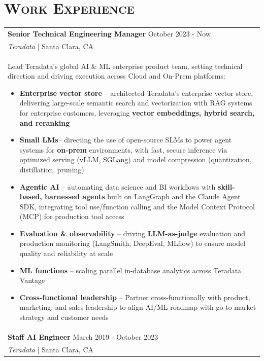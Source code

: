 \documentclass[letterpaper,11pt]{article} %
\begin{document}
\section{\Large\bf\textsc{Work Experience}}
\begin{tabular}{p{18.5cm}}

{\bf Senior Technical Engineering Manager} \hfill October 2023 - Now\\
{\it{Teradata}}  | Santa Clara, CA\\


 Lead Teradata's global AI \& ML enterprise product team, setting technical direction and driving execution across Cloud and On-Prem platforms:
\begin{itemize}
\item \textbf{Enterprise vector store} -- architected Teradata's enterprise vector store, delivering large-scale semantic search and vectorization with RAG systems for enterprise customers, leveraging \textbf{vector embeddings, hybrid search, and reranking}
\item \textbf{Small LMs}-- directing the use of open-source SLMs to power agent systems for \textbf{on-prem} environments, with fast, secure inference via optimized serving (vLLM, SGLang) and model compression (quantization, distillation, pruning) 
\item \textbf{Agentic AI} -- automating data science and BI workflows with \textbf{skill-based, harnessed agents} built on LangGraph and the Claude Agent SDK, integrating tool use/function calling and the Model Context Protocol (MCP) for production tool access
\item \textbf{Evaluation \& observability} – driving \textbf{LLM-as-judge} evaluation and production monitoring (LangSmith, DeepEval, MLflow) to ensure model quality and reliability at scale
\item \textbf{ML functions} -- scaling parallel in-database analytics across Teradata Vantage
\item \textbf{Cross-functional leadership} -- Partner cross-functionally with product, marketing, and sales leadership to align AI/ML roadmap with go-to-market strategy and customer needs 

\end{itemize} \\ 
\vspace{.1mm}

{\bf Staff AI Engineer} \hfill March 2019 - October 2023\\
{\it{Teradata}}  |  Santa Clara, CA\\



\end{tabular}
\end{document}
